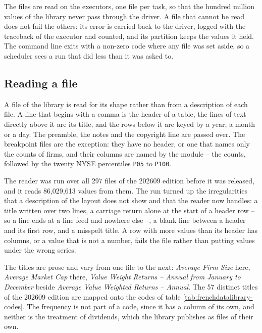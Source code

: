The files are read on the executors, one file per task, so that the hundred million values of the library never pass through the driver. A file that cannot be read does not fail the others: its error is carried back to the driver, logged with the traceback of the executor and counted, and its partition keeps the values it held. The command line exits with a non-zero code where any file was set aside, so a scheduler sees a run that did less than it was asked to.

\subsection{Reading a file}

A file of the library is read for its shape rather than from a description of each file. A line that begins with a comma is the header of a table, the lines of text directly above it are its title, and the rows below it are keyed by a year, a month or a day. The preamble, the notes and the copyright line are passed over. The breakpoint files are the exception: they have no header, or one that names only the counts of firms, and their columns are named by the module -- the counts, followed by the twenty NYSE percentiles \verb|P05| to \verb|P100|.

The reader was run over all 297 files of the 202609 edition before it was released, and it reads 86{,}029{,}613 values from them. The run turned up the irregularities that a description of the layout does not show and that the reader now handles: a title written over two lines, a carriage return alone at the start of a header row -- so a line ends at a line feed and nowhere else --, a blank line between a header and its first row, and a misspelt title. A row with more values than its header has columns, or a value that is not a number, fails the file rather than putting values under the wrong series.

The titles are prose and vary from one file to the next: \emph{Average Firm Size} here, \emph{Average Market Cap} there, \emph{Value Weight Returns -- Annual from January to December} beside \emph{Average Value Weighted Returns -- Annual}. The 57 distinct titles of the 202609 edition are mapped onto the codes of table \ref{tab:frenchdatalibrary-codes}. The frequency is not part of a code, since it has a column of its own, and neither is the treatment of dividends, which the library publishes as files of their own.

